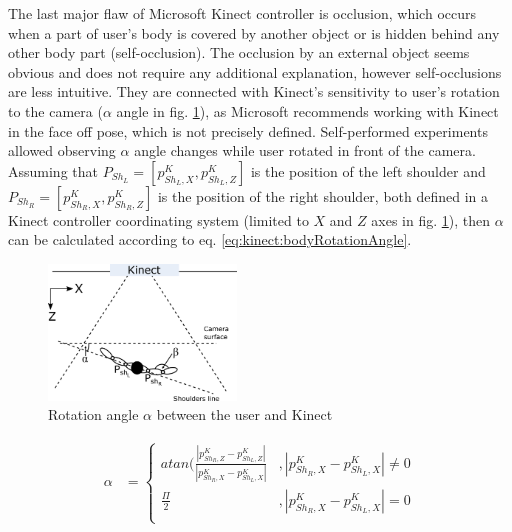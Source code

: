 \documentclass[sensors,article,submit,moreauthors,pdftex,10pt,a4paper]{mdpi}
\begin{document}
The last major flaw of Microsoft Kinect controller is occlusion, which occurs when a part of user’s body is covered by another object or is hidden behind any other body part (self-occlusion). The occlusion by an external object seems obvious and does not require any additional explanation, however self-occlusions are less intuitive. They are connected with Kinect’s sensitivity to user’s rotation to the camera ($\alpha$ angle in fig. \ref{fig:kinect:rotationAngle}), as Microsoft recommends working with Kinect in the face off pose, which is not precisely defined. Self-performed experiments allowed observing $\alpha$ angle changes while user rotated in front of the camera. Assuming that $P_{Sh_L} = [p^K_{{Sh}_L,X} , p^K_{{Sh}_L,Z}]$ is the position of the left shoulder and $P_{Sh_R} = [p^K_{{Sh}_R,X} , p^K_{{Sh}_R,Z}]$ is the position of the right shoulder, both defined in a Kinect controller coordinating system (limited to $X$ and $Z$ axes in fig. \ref{fig:kinect:rotationAngle}), then $\alpha$ can be calculated according to eq. \ref{eq:kinect:bodyRotationAngle}.
	
	\begin{figure}[H] %
		\centering
		\includegraphics[width=5cm]{Figure3.png}
		\caption{Rotation angle $\alpha$ between the user and Kinect}
		\label{fig:kinect:rotationAngle}
	\end{figure}
	
	\begin{equation}
		\label{eq:kinect:bodyRotationAngle}
		\begin{split}
			\alpha &= 
			\begin{cases} 
				atan(\frac{|p^K_{{Sh}_R,Z} - p^K_{{Sh}_L,Z}|}{|p^K_{{Sh}_R,X} - p^K_{{Sh}_L,X}|} & , |p^K_{{Sh}_R,X} - p^K_{{Sh}_L,X}| \neq 0 \\
				\frac{\Pi}{2}                                                                    & , |p^K_{{Sh}_R,X} - p^K_{{Sh}_L,X}| = 0    \\		
			\end{cases}
		\end{split}
	\end{equation}
	
\end{document}

